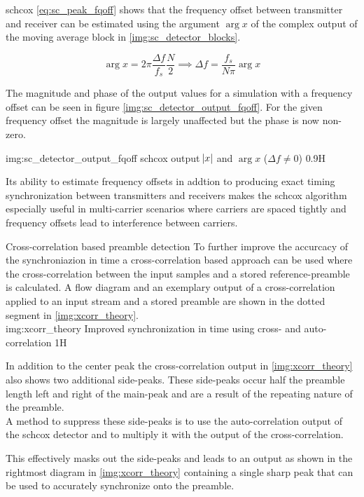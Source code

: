 \begin{subchapter}{\acrlong{schcox}}
  \autoref{eq:sc_peak_fqoff} shows that the frequency offset between transmitter
  and receiver can be estimated using the argument $\arg{x}$ of the complex output of the
  moving average block in \autoref{img:sc_detector_blocks}.

  \begin{equation*}
    \arg{x} = 2 \pi \frac{\Delta f}{f_s} \frac{N}{2} \implies \Delta f = \frac{f_s}{N \pi} \arg{x}
  \end{equation*}

  The magnitude and phase of the output values for a simulation with a
  frequency offset can be seen in figure \ref{img:sc_detector_output_fqoff}.
  For the given frequency offset the magnitude is largely unaffected but
  the phase is now non-zero.

               {img:sc_detector_output_fqoff}
               {\acrshort{schcox} output $\abs{x}$ and $\arg{x}$ ($\Delta f \neq 0$)}
               {0.9}{H}
\end{subchapter}

Its ability to estimate frequency offsets in addtion to producing
exact timing synchronization between transmitters and
receivers makes the \acrshort{schcox} algorithm especially useful
in multi-carrier scenarios where carriers are spaced tightly and
frequency offsets lead to interference between carriers.

\begin{subchapter}{Cross-correlation based preamble detection}
  \label{sec:xcorrtheo}
  To further improve the accurcacy of the synchroniazion in time
  a cross-correlation based approach can be used where the cross-correlation
  between the input samples and a stored reference-preamble is
  calculated.
  A flow diagram and an exemplary output of a cross-correlation
  applied to an input stream and a stored preamble are shown
  in the dotted segment in \autoref{img:xcorr_theory}. \\

               {img:xcorr_theory}
               {Improved synchronization in time using cross- and auto-correlation}
               {1}{H}

  In addition to the center peak the cross-correlation output
  in \autoref{img:xcorr_theory} also shows two additional side-peaks.
  These side-peaks occur half the preamble length left and right
  of the main-peak and are a result of the repeating nature of
  the preamble. \\

  A method to suppress these side-peaks is to use the auto-correlation
  output of the \gls{schcox} detector and to multiply it with the
  output of the cross-correlation\cite{awoseyila}.

  This effectively masks out the side-peaks and leads to an output as
  shown in the rightmost diagram in \autoref{img:xcorr_theory} containing
  a single sharp peak that can be used to accurately synchronize
  onto the preamble.
\end{subchapter}

